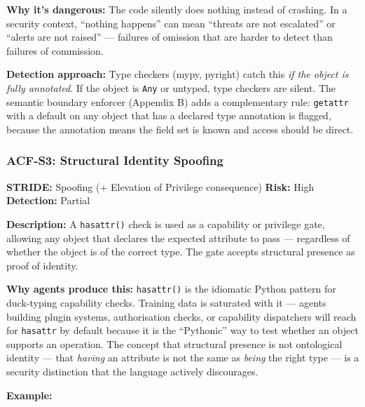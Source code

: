 \documentclass[a4paper,11pt]{report}
\begin{document}
\textbf{Why it's dangerous:} The code silently does nothing instead of
crashing. In a security context, ``nothing happens'' can mean ``threats
are not escalated'' or ``alerts are not raised'' --- failures of
omission that are harder to detect than failures of commission.

\textbf{Detection approach:} Type checkers (mypy, pyright) catch this
\emph{if the object is fully annotated}. If the object is \texttt{Any}
or untyped, type checkers are silent. The semantic boundary enforcer
(Appendix B) adds a complementary rule: \texttt{getattr} with a default
on any object that has a declared type annotation is flagged, because
the annotation means the field set is known and access should be direct.

\hypertarget{acf-s3-structural-identity-spoofing}{%
\subsubsection{ACF-S3: Structural Identity
Spoofing}\label{acf-s3-structural-identity-spoofing}}

\textbf{STRIDE:} Spoofing (+ Elevation of Privilege consequence)
\textbar{} \textbf{Risk:} High \textbar{} \textbf{Detection:} Partial

\textbf{Description:} A \texttt{hasattr()} check is used as a capability
or privilege gate, allowing any object that declares the expected
attribute to pass --- regardless of whether the object is of the correct
type. The gate accepts structural presence as proof of identity.

\textbf{Why agents produce this:} \texttt{hasattr()} is the idiomatic
Python pattern for duck-typing capability checks. Training data is
saturated with it --- agents building plugin systems, authorisation
checks, or capability dispatchers will reach for \texttt{hasattr} by
default because it is the ``Pythonic'' way to test whether an object
supports an operation. The concept that structural presence is not
ontological identity --- that \emph{having} an attribute is not the same
as \emph{being} the right type --- is a security distinction that the
language actively discourages.

\textbf{Example:}
\end{document}
